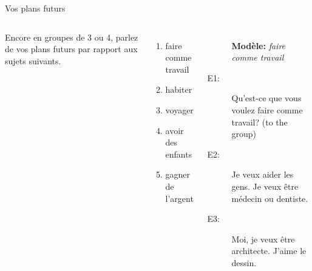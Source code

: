 \begin{frame}{Vos plans futurs}
  \begin{columns}
      Encore en groupes de 3 ou 4, parlez de vos plans futurs par rapport aux sujets suivants. \\
      \begin{enumerate}
        \item faire comme travail
        \item habiter
        \item voyager
        \item avoir des enfants
        \item gagner de l'argent
      \end{enumerate}
      \begin{description}
        \item[] \textbf{Modèle:} \emph{faire comme travail}
        \item[E1:] Qu'est-ce que vous voulez faire comme travail? (to the group)
        \item[] 
        \item[E2:] Je veux aider les gens. Je veux être médecin ou dentiste.
        \item[] 
        \item[E3:] Moi, je veux être architecte. J'aime le dessin.
        \item[] 
      \end{description}
  \end{columns}
\end{frame}